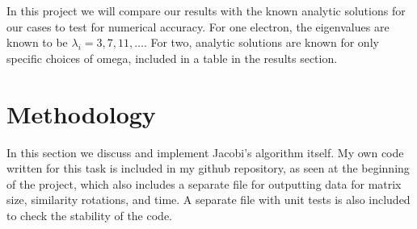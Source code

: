 \documentclass[11pt,a4paper]{article}
\begin{document}
{In this project we will compare our results with the known analytic solutions for our cases to test for numerical accuracy. For one electron, the eigenvalues are known to be $\lambda_i = 3, 7, 11, \dots$. For two, analytic solutions are known for only specific choices of omega, included in a table in the results section.

\section{Methodology}

In this section we discuss and implement Jacobi's algorithm itself. My own code written for this task is included in my github repository, as seen at the beginning of the project, which also includes a separate file for outputting data for matrix size, similarity rotations, and time. A separate file with unit tests is also included to check the stability of the code.

}
\end{document}
